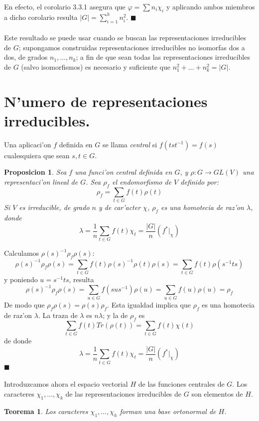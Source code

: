\documentclass[a4paper,openright,12pt]{report}
\numberwithin{equation}{section} %
\newtheorem{teorema}{Teorema}[section] %
\newtheorem{proposicion}{Proposicion}[section] %
\newenvironment{proof}{\noindent{\it Demostracion:}}{\hfill$\blacksquare$} %
\begin{document}
\begin{proof}
En efecto, el corolario 3.3.1 asegura que $\varphi = \sum n_{i} \chi_{i}$ y aplicando ambos miembros a dicho corolario resulta $|G|=\sum_{i=1}^{h} n_{i}^{2}$. 
\end{proof}\\
\\
Este resultado se puede usar cuando se buscan las representaciones irreducibles de $G$; supongamos construidas representaciones irreducibles no isomorfas dos a dos, de grados $n_{1}, \ldots ,n_{k}$; a fin de que sean todas las representaciones irreducibles de $G$ (salvo isomorfismos) es necesario y suficiente que $n_{1}^{2}+ \ldots + n_{k}^{2}=|G|$.
\section{N'umero de representaciones irreducibles.}
Una aplicaci'on $f$ definida en $G$ se llama \emph{central} si $f(tst^{-1})=f(s)$ cualesquiera que sean $s, t \in G$.
\begin{proposicion}
Sea $f$ una funci'on central definida en $G$, y $\rho: G \rightarrow GL(V)$ una representaci'on lineal de $G$. Sea $\rho_{f}$ el endomorfismo de $V$ definido por:
\[
\rho_{f}=\sum_{t \in G} f(t)\rho (t)
\]
Si $V$ es irreducible, de grado $n$ y de car'acter $\chi$, $\rho_{f}$ es una homotecia de raz'on $\lambda$, donde
\[
\lambda = \frac{1}{n}\sum_{t \in G} f(t)\chi_{t}=\frac{|G|}{n}(f^{*}|_{\chi})
\]
\end{proposicion}
\begin{proof}
Calculamos $\rho (s)^{-1}\rho_{f}\rho (s) $:
\[
\rho (s)^{-1}\rho_{f}\rho (s)=\sum_{t \in G}f(t)\rho(s)^{-1}\rho(t)\rho(s)=\sum_{t \in G}f(t)\rho(s^{-1}ts)
\]
y poniendo $u=s^{-1}ts$, resulta
\[
\rho (s)^{-1}\rho_{f}\rho (s)=\sum_{u \in G}f(sus^{-1})\rho (u)=\sum_{u \in G}f(u)\rho (u)=\rho_{f}
\]
De modo que $\rho_{f}\rho(s)=\rho(s)\rho_{f}$. Esta igualdad implica que $\rho_{f}$ es una homotecia de raz'on $\lambda$. La traza de $\lambda$ es $n \lambda$; y la de $\rho_{f}$ es
\[
\sum_{t \in G}f(t)Tr(\rho (t))=\sum_{t \in G}f(t)\chi (t)
\]
de donde
\[
\lambda = \frac{1}{n}\sum_{t \in G} f(t)\chi_{t}=\frac{|G|}{n}(f^{*}|_{\chi})
\]
\end{proof}\\
\\
Introduzcamos ahora el espacio vectorial $H$ de las funciones centrales de $G$. Los caracteres 
$\chi_{1}, \ldots ,\chi_{k}$ de las representaciones irreducibles de $G$ son elementos de $H$.
\begin{teorema}
Los caracteres $\chi_{1}, \ldots ,\chi_{h}$ forman una base ortonormal de $H$.
\end{teorema}
\end{document}

